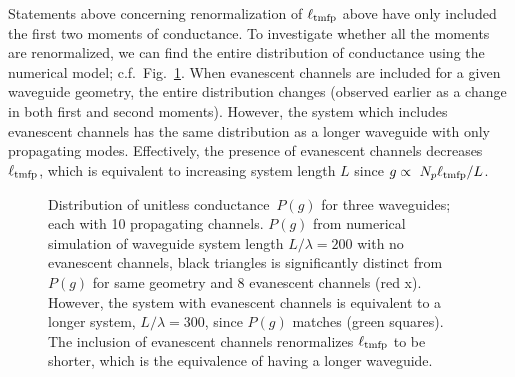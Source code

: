 Statements above concerning renormalization of $\ell_{\rm tmfp}$ above have only included the first two moments of conductance. To investigate whether all the moments are renormalized, we can find the entire distribution of conductance using the numerical model; c.f.~Fig.~\ref{fig:distgversusg}. When evanescent channels are included for a given waveguide geometry, the entire distribution changes (observed earlier as a change in both first and second moments). However, the system which includes evanescent channels has the same distribution as a longer waveguide with only propagating modes. Effectively, the presence of evanescent channels decreases $\ell_{\rm tmfp}$, which is equivalent to increasing system length $L$ since $g\propto~N_p\ell_{\rm tmfp}/L$. 
\begin{figure}
\vskip -0.5cm
\centerline{
}
\vskip -0.5cm
\caption[Distribution of unitless conductance~$P(g)$ for three waveguides; each with 10 propagating channels.]{Distribution of unitless conductance~$P(g)$ for three waveguides; each with 10 propagating channels.  $P(g)$ from numerical simulation of waveguide system length $L/\lambda=200$ with no evanescent channels, black triangles is significantly distinct from $P(g)$ for same geometry and 8 evanescent channels (red x). However, the system with evanescent channels is equivalent to a longer system, $L/\lambda=300$, since $P(g)$ matches (green squares). The inclusion of evanescent channels renormalizes $\ell_{\rm tmfp}$ to be shorter, which is the equivalence of having a longer waveguide.}
\label{fig:distgversusg}
\end{figure}


